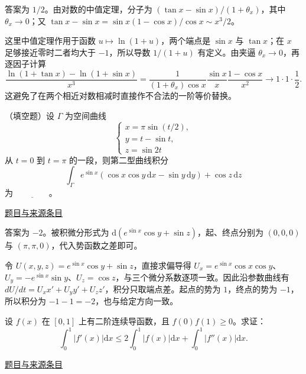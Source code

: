 \documentclass[12pt,fontset=fandol]{ctexart}
\begin{document}
\begin{solve}\label{ans:fin09-hi:2}

答案为 $1/2$。由对数的中值定理，分子为 $(\tan x-\sin x)/(1+\theta_x)$，其中 $\theta_x\to0$；又 $\tan x-\sin x=\sin x(1-\cos x)/\cos x\sim x^3/2$。

这里中值定理作用于函数 $u\mapsto\ln(1+u)$，两个端点是 $\sin x$ 与 $\tan x$；在 $x$ 足够接近零时二者均大于 $-1$，所以导数 $1/(1+u)$ 有定义。由夹逼 $\theta_x\to0$，再逐因子计算
\[
\frac{\ln(1+\tan x)-\ln(1+\sin x)}{x^3}
=\frac1{(1+\theta_x)\cos x}\frac{\sin x}{x}\frac{1-\cos x}{x^2}
\longrightarrow1\cdot1\cdot\frac12.
\]
这避免了在两个相近对数相减时直接作不合法的一阶等价替换。

\end{solve}

\begin{example}[来源序号3]\label{ex:fin09-hi:3}\label{pr:fin09-hi:3}

（填空题）设 $\Gamma$ 为空间曲线
\[
\begin{cases} x=\pi \sin\left(t/2\right), \\ y=t-\sin t, \\ z=\sin 2t \end{cases}
\]
从 $t=0$ 到 $t=\pi$ 的一段，则第二型曲线积分
\[
\int_{\Gamma} e^{\sin x}\left(\cos x \cos y\, \mathrm{d} x-\sin y\, \mathrm{d} y\right)+\cos z\, \mathrm{d} z
\]
为 $\underline{\qquad\qquad}$。

\par\href{https://github.com/lzxcr/cmc-mathematics/blob/64916fa1fdbc3e444a652eca204d5669058ee321/src/problems/finals/09/03.md}{题目与来源条目}

\end{example}

\begin{solve}\label{ans:fin09-hi:3}

答案为 $-2$。被积微分形式为 $\mathrm d(e^{\sin x}\cos y+\sin z)$，起、终点分别为 $(0,0,0)$ 与 $(\pi,\pi,0)$，代入势函数之差即可。

令 $U(x,y,z)=e^{\sin x}\cos y+\sin z$，直接求偏导得 $U_x=e^{\sin x}\cos x\cos y$、$U_y=-e^{\sin x}\sin y$、$U_z=\cos z$，与三个微分系数逐项一致。因此沿参数曲线有 $dU/dt=U_xx'+U_yy'+U_zz'$，积分只取端点差。起点的势为 $1$，终点的势为 $-1$，所以积分为 $-1-1=-2$，也与给定方向一致。

\end{solve}

\begin{example}[来源序号7]\label{ex:fin09-hi:7}\label{pr:fin09-hi:7}

设 $f(x)$ 在 $[0, 1]$ 上有二阶连续导函数，且 $f(0)f(1) \geq 0$。求证：
\[
\int_0^1 \left|f'(x)\right| \mathrm{d}x \leq 2 \int_0^1 |f(x)| \mathrm{d}x + \int_0^1 \left|f''(x)\right| \mathrm{d}x.
\]

\par\href{https://github.com/lzxcr/cmc-mathematics/blob/64916fa1fdbc3e444a652eca204d5669058ee321/src/problems/finals/09/07.md}{题目与来源条目}

\end{example}
\end{document}
